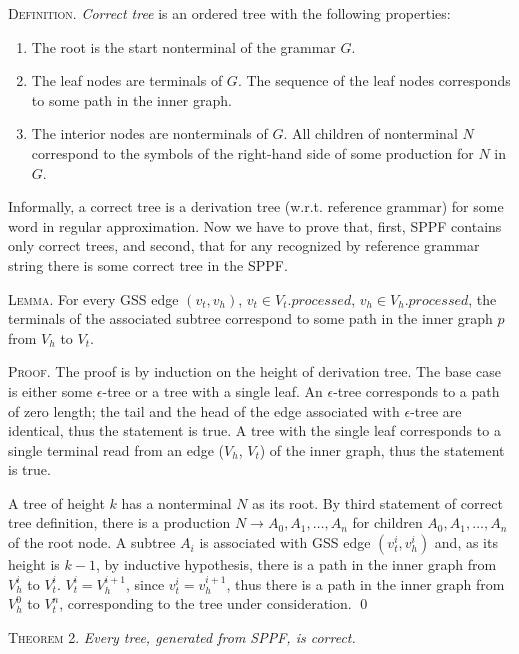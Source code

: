 \textsc{Definition.} 
\emph{Correct tree} is an ordered tree with the following properties:
\begin{enumerate}
  \item The root is the start nonterminal of the grammar $G$.
  \item The leaf nodes are terminals of $G$. The sequence of the leaf nodes 
        corresponds to some path in the inner graph. 
  \item The interior nodes are nonterminals of $G$. All children of nonterminal 
        $N$ correspond to the symbols of the right-hand side of some production for $N$ in $G$.
\end{enumerate}

Informally, a correct tree is a derivation tree (w.r.t. reference grammar) for some word in 
regular approximation. Now we have to prove that, first, SPPF contains only correct trees, 
and second, that for any recognized by reference grammar string there is some correct tree in
the SPPF.

\textsc{Lemma.}
For every GSS edge $(v_{t}, v_{h})$, $v_{t} \in V_{t}.processed$, $v_{h} \in V_{h}.processed$, 
the terminals of the associated subtree correspond to some path in the inner graph $p$ 
from $V_{h}$ to $V_{t}$.

\textsc{Proof.}
The proof is by induction on the height of derivation tree. 
The base case is either some $\epsilon$-tree or a tree with a single leaf. An $\epsilon$-tree corresponds 
to a path of zero length; the tail and the head of the edge associated with $\epsilon$-tree are identical, 
thus the statement is true. A tree with the single leaf corresponds to a single terminal read from an edge 
($V_{h}$, $V_{t}$) of the inner graph, thus the statement is true.

A tree of height $k$ has a nonterminal $N$ as its root. By third statement of correct tree definition, 
there is a production $N \rightarrow A_{0}, A_{1}, \dots, A_{n}$ for children $A_{0}, A_{1}, \dots, A_{n}$ of the root node. 
A subtree $A_{i}$ is associated with GSS edge $(v_{t}^{i}, v_{h}^{i})$ and, as its height is $k-1$, by inductive hypothesis,
there is a path in the inner graph from $V_{h}^{i}$ to $V_{t}^{i}$. $V_{t}^i = V_{h}^{i+1}$, since $v_{t}^i = v_{h}^{i+1}$, 
thus there is a path in the inner graph from $V_{h}^{0}$ to $V_{t}^{n}$, corresponding to the tree under consideration.
\qed

\textsc{Theorem 2.} 
\textit{Every tree, generated from SPPF, is correct.}

